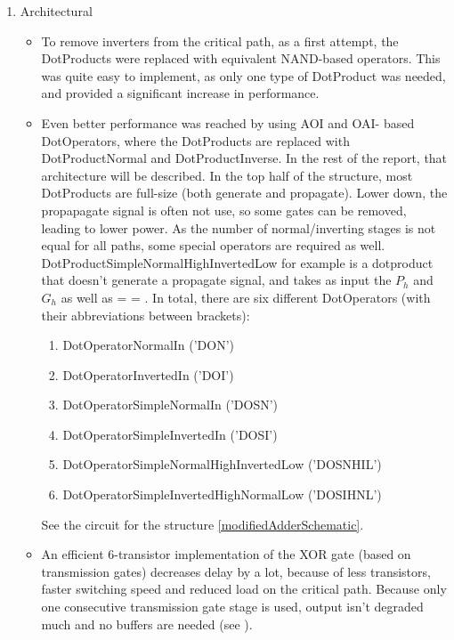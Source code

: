 \documentclass[english]{article}
\makeatletter
\newlength\mylenA
\newcommand*\xoverline[2][0.75]{%
    \sbox{\myboxA}{$\m@th#2$}%
    \setbox\myboxB\null%
    \ht\myboxB=\ht\myboxA%
    \dp\myboxB=\dp\myboxA%
    \wd\myboxB=#1\wd\myboxA%
    \sbox\myboxB{$\m@th\overline{\copy\myboxB}$}%
    \setlength\mylenA{\the\wd\myboxA}%
    \addtolength\mylenA{-\the\wd\myboxB}%
    \ifdim\wd\myboxB<\wd\myboxA%
       \rlap{\hskip 0.5\mylenA\usebox\myboxB}{\usebox\myboxA}%
    \else
        \hskip -0.5\mylenA\rlap{\usebox\myboxA}{\hskip 0.5\mylenA\usebox\myboxB}%
    \fi}
\makeatother
\begin{document}
\begin{enumerate}
\item Architectural \label{itm:arch}

\begin{itemize}
\item To remove inverters from the critical path, as a first attempt, the DotProducts were replaced with equivalent NAND-based operators. This was quite easy to implement, as only one type of DotProduct was needed, and provided a significant increase in performance. 
  
\item Even better performance was reached by using AOI and OAI- based DotOperators, where the DotProducts are replaced with DotProductNormal and DotProductInverse. In the rest of the report, that architecture will be described.
In the top half of the structure, most DotProducts are full-size (both generate and propagate).
Lower down, the propapagate signal is often not use, so some gates can be removed, leading to lower power.
As the number of normal/inverting stages is not equal for all paths, some special operators are required as well. DotProductSimpleNormalHighInvertedLow for example is a dotproduct that doesn't generate a propagate signal, and takes as input the $P_h$ and $G_h$ as well as \xoverline{G_l}.
In total, there are six different DotOperators (with their abbreviations between brackets):

\begin{enumerate}
\item DotOperatorNormalIn ('DON')
\item DotOperatorInvertedIn ('DOI')
\item DotOperatorSimpleNormalIn ('DOSN')
\item DotOperatorSimpleInvertedIn ('DOSI')
\item DotOperatorSimpleNormalHighInvertedLow ('DOSNHIL')
\item DotOperatorSimpleInvertedHighNormalLow ('DOSIHNL')
\end{enumerate}
See the circuit for the structure \ref{modifiedAdderSchematic}.

\item An efficient 6-transistor implementation of the XOR gate (based on transmission gates) decreases delay by a lot, because of less transistors, faster switching speed and reduced load on the critical path. Because only one consecutive transmission gate stage is used, output isn't degraded much and no buffers are needed (see \cite{website:xorTransmissionGate}).


\end{itemize}
\end{enumerate}
\end{document}
